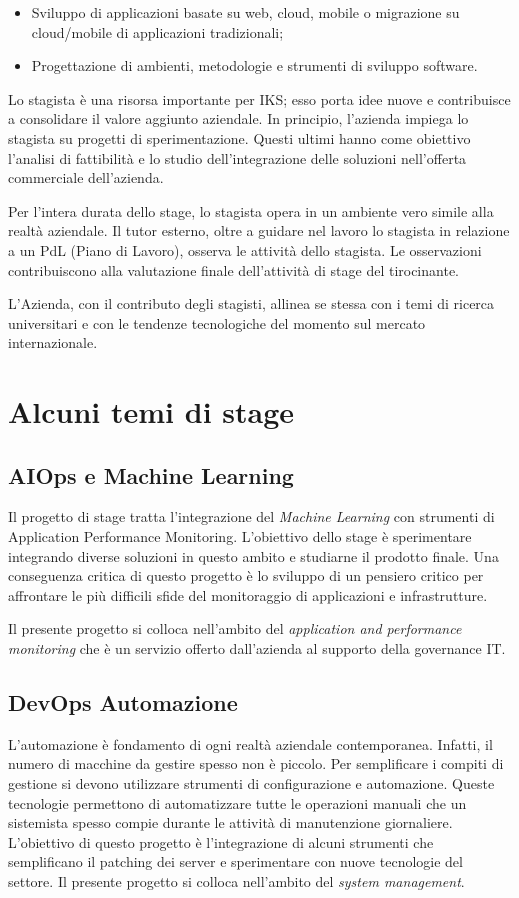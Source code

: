 \begin{itemize}
	\item Sviluppo di applicazioni basate su web, \gls{cloud}, mobile 
	      o migrazione su \gls{cloud}/mobile di applicazioni tradizionali;
	\item Progettazione di ambienti, metodologie e strumenti di 
	      sviluppo software.
\end{itemize}

Lo stagista è una risorsa importante per IKS; esso porta idee nuove e 
contribuisce a consolidare il valore aggiunto aziendale.
In principio, l'azienda impiega lo stagista su progetti di sperimentazione. 
Questi ultimi hanno come obiettivo l'analisi di fattibilità e lo studio 
dell'integrazione delle soluzioni nell'offerta commerciale dell'azienda. 

Per l'intera durata dello stage, lo stagista opera in un ambiente vero 
simile alla realtà aziendale. Il tutor esterno, oltre a guidare nel lavoro 
lo stagista in relazione a un PdL (Piano di Lavoro), osserva le attività 
dello stagista. 
Le osservazioni contribuiscono alla valutazione finale dell'attività di 
stage del tirocinante.

L'Azienda, con il contributo degli stagisti, allinea se stessa con i 
temi di ricerca universitari e con le tendenze tecnologiche del momento 
sul mercato internazionale.

\section{Alcuni temi di stage}
\subsection{AIOps e Machine Learning}
Il progetto di stage tratta l'integrazione del \textit{Machine Learning} 
con strumenti di Application Performance Monitoring. L'obiettivo dello 
stage è sperimentare integrando diverse soluzioni in questo ambito e 
studiarne il prodotto finale. Una conseguenza critica di questo progetto è 
lo sviluppo di un pensiero critico per affrontare le più difficili sfide 
del monitoraggio di applicazioni e infrastrutture. 

Il presente progetto si colloca nell'ambito del 
\textit{application and performance monitoring} che è un 
servizio offerto dall'azienda al supporto della governance IT. 


\subsection{DevOps Automazione}
L'automazione è fondamento di ogni realtà aziendale contemporanea. Infatti, 
il numero di macchine da gestire spesso non è piccolo. Per semplificare i 
compiti di gestione si devono utilizzare strumenti di configurazione e 
automazione. Queste tecnologie permettono di automatizzare tutte le operazioni 
manuali che un sistemista spesso compie durante le attività di manutenzione 
giornaliere. L'obiettivo di questo progetto è l'integrazione di alcuni 
strumenti che semplificano il \gls{patching} dei server e sperimentare con 
nuove tecnologie del settore.
Il presente progetto si colloca nell'ambito del \textit{system management}. 

